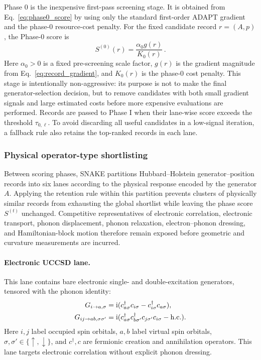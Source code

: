 \documentclass[
  reprint,
  amsmath,
  amssymb,
  aps,
  pra,
  nofootinbib,
  superscriptaddress,
  floatfix
]{revtex4-2}
\newcommand{\ii}{\mathrm{i}}
\begin{document}
\noindent
Phase 0 is the inexpensive first-pass screening stage. It is obtained from Eq.~\eqref{eq:phase0_score} by using only the standard first-order ADAPT gradient and the phase-0 resource-cost penalty. For the fixed candidate record \(r=(A,p)\), the Phase-0 score is
%
\begin{equation}
S^{(0)}(r)=\frac{\alpha_0 g(r)}{K_0(r)}\,.
\label{eq:phase0_score}
\end{equation}
%
Here \(\alpha_0>0\) is a fixed pre-screening scale factor, \(g(r)\) is the gradient magnitude from Eq.~\eqref{eq:record_gradient}, and \(K_0(r)\) is the phase-0 cost penalty. This stage is intentionally non-aggressive: its purpose is not to make the final generator-selection decision, but to remove candidates with both small gradient signals and large estimated costs before more expensive evaluations are performed. Records are passed to Phase I when their lane-wise score exceeds the threshold \(\tau_{0,\ell}\). To avoid discarding all useful candidates in a low-signal iteration, a fallback rule also retains the top-ranked records in each lane.

\subsubsection{Physical operator-type shortlisting}
\label{subsec:hh_physical_operator_lanes}
%
\noindent
Between scoring phases, \textsc{SNAKE} partitions Hubbard--Holstein
generator--position records into six lanes according to the physical response
encoded by the generator \(A\). Applying the retention rule
within this partition prevents clusters of physically similar records from
exhausting the global shortlist while leaving the phase score \(S^{(t)}\)
unchanged. Competitive representatives of electronic correlation, electronic
transport, phonon displacement, phonon relaxation, electron--phonon dressing,
and Hamiltonian-block motion therefore remain exposed before geometric and
curvature measurements are incurred.

\paragraph*{Electronic UCCSD lane.}
This lane contains bare electronic single- and double-excitation generators,
tensored with the phonon identity:
\begin{align*}
G_{i\to a,\sigma}
&=
\ii(c_{a\sigma}^{\dagger}c_{i\sigma}
-c_{i\sigma}^{\dagger}c_{a\sigma}),\\
G_{ij\to ab,\sigma\sigma'}
&=
\ii(c_{a\sigma}^{\dagger}c_{b\sigma'}^{\dagger}
c_{j\sigma'}c_{i\sigma}
-{\rm h.c.}) .
\end{align*}
Here \(i,j\) label occupied spin orbitals, \(a,b\) label virtual spin orbitals,
\(\sigma,\sigma'\in\{\uparrow,\downarrow\}\), and \(c^\dagger,c\) are
fermionic creation and annihilation operators. This lane targets electronic
correlation without explicit phonon dressing.
\end{document}
